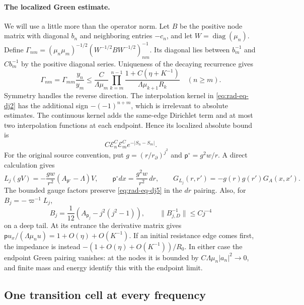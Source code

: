 \paragraph{The localized Green estimate.}
We will use a little more than the operator norm.  Let $B$ be the
positive node matrix with diagonal $b_n$ and neighboring entries
$-c_n$, and let $W=\operatorname{diag}(\mu_n)$.
Define
$\Gamma_{nm}=(\mu_n\mu_m)^{-1/2}
 (W^{-1/2}BW^{-1/2})^{-1}_{nm}$.
Its diagonal lies between $b_m^{-1}$ and $Cb_m^{-1}$ by the
positive diagonal series.  Uniqueness of the decaying recurrence gives
\begin{equation}\label{eq:rad-eq-dj4}
 \Gamma_{nm}=\Gamma_{mm}\frac{y_n}{y_m}
 \le\frac{C}{\Lambda\mu_m}
      \prod_{k=m}^{n-1}\frac{1+C(\eta+K^{-1})}{\Lambda\mu_{k+1}R_k}
 \quad(n\ge m).
\end{equation}
Symmetry handles the reverse direction.  The interpolation kernel in
\eqref{eq:rad-eq-dj2} has the additional sign $-(-1)^{n+m}$, which
is irrelevant to absolute estimates.  The continuous kernel adds the
same-edge Dirichlet term and at most two interpolation functions at
each endpoint.  Hence its localized absolute bound is
\begin{equation}\label{eq:rad-eq-dj5}
 C\mathcal E_n^C\mathcal E_m^C e^{-|S_n-S_m|}.
\end{equation}
For the original source convention, put
$g=(r/r_\partial)^{j^2}$ and $\mathsf p^\circ=g^2w/r$.
A direct calculation gives
\[
 L_j(gV)=-\frac{gw}{r^2}(A_{\mathsf p^\circ}-\Lambda)V,
 \qquad \mathsf p^\circ dx=\frac{g^2w}{r^2}\,dr,
 \qquad G_{L_j}(r,r')=-g(r)g(r')G_A(x,x').
\]
The bounded gauge factors preserve \eqref{eq:rad-eq-dj5} in the
$dr$ pairing.  Also, for $B_j=-\varpi^{-1}L_j$,
\begin{equation}\label{eq:rad-eq-rm20}
 B_j=\frac1{12}(A_{\mathsf p_j}-j^2(j^2-1)),
 \qquad \|B_{j,D}^{-1}\|\le Cj^{-4}
\end{equation}
on a deep tail.  At its entrance the derivative matrix gives
$\mathsf p u_x/(\Lambda\mu_nu)=1+O(\eta)+O(K^{-1})$.
If an initial resistance edge comes first, the impedance is instead
$-(1+O(\eta)+O(K^{-1}))/R_0$.  In either case the endpoint
Green pairing vanishes: at the nodes it is bounded by
$C\Lambda\mu_n|a_n|^2\to0$, and finite mass and energy identify this
with the endpoint limit.

\subsection{One transition cell at every frequency}

